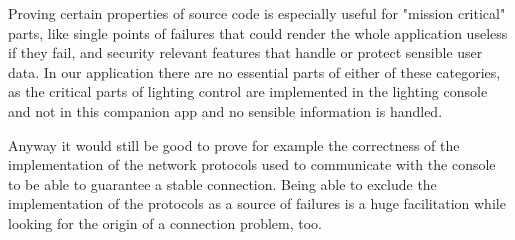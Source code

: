 \documentclass{scrreprt}
\begin{document}
Proving certain properties of source code is especially useful for "mission critical" parts, like single points of failures that could render the whole application useless if they fail, and security relevant features that handle or protect sensible user data. In our application there are no essential parts of either of these categories, as the critical parts of lighting control are implemented in the lighting console and not in this companion app and no sensible information is handled.

Anyway it would still be good to prove for example the correctness of the implementation of the network protocols used to communicate with the console to be able to guarantee a stable connection. Being able to exclude the implementation of the protocols as a source of failures is a huge facilitation while looking for the origin of a connection problem, too.

\end{document}

